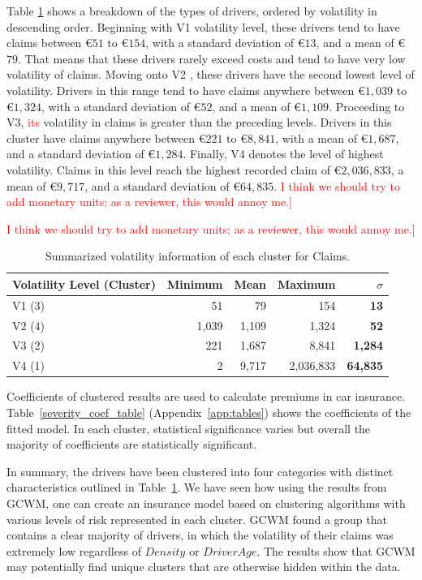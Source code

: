 \documentclass[11pt,letterpaper]{article}
\numberwithin{equation}{section}
\numberwithin{equation}{section}
\numberwithin{equation}{section}
\begin{document}
Table \ref{table:volSev} shows a breakdown of the types of drivers, ordered by volatility in descending order. Beginning with V1 volatility level, these drivers tend to have claims between \euro$51$ to  \euro$ 154$, with a standard deviation of  \euro$13$, and a mean of  \euro$79$. That means that these drivers rarely exceed costs and tend to have very low volatility of claims. Moving onto V2 , these drivers have the second lowest level of volatility. Drivers in this range tend to have claims anywhere between  \euro$1,039$ to  \euro$1,324$, with a standard deviation of  \euro$52$, and a mean of  \euro$1,109$.  Proceeding to V3, \textcolor{red}{its} volatility in claims is greater than the preceding levels. Drivers in this cluster have claims anywhere between  \euro$221$ to  \euro$8,841$, with a mean of  \euro$1,687$, and a standard deviation of  \euro$1,284$. Finally, V4 denotes the level of highest volatility. Claims in this level  reach the highest recorded claim of  \euro$2,036,833$, a mean of  \euro$9,717$, and a standard deviation of  \euro$64,835$. \textcolor{red}{I think we should try to add monetary units; as a reviewer, this would annoy me.]}

 \textcolor{red}{I think we should try to add monetary units; as a reviewer, this would annoy me.]}
 
\begin{table}[!htb]
\centering
\caption{Summarized volatility information of each cluster for Claims.}
\label{table:volSev}
\begin{tabular}{lrrrr}
\hline
Volatility Level (Cluster)     & Minimum & Mean  & Maximum & $\sigma$    \\
\hline
V1 (3) & 51  & 79 & 154 & \textbf{ 13} \\
V2 (4) & 1,039  & 1,109  &  1,324 & \textbf{ 52} \\
V3 (2) & 221 & 1,687  & 8,841  &\textbf{ 1,284}  \\
V4 (1) & 2 & 9,717 & 2,036,833  & \textbf{ 64,835}\\
\hline
\end{tabular}
\end{table}


Coefficients of clustered results are used to calculate premiums in car insurance. Table~\ref{severity_coef_table} (Appendix~\ref{app:tables}) shows the coefficients of the fitted model. In each cluster, statistical significance varies but overall the majority of coefficients are statistically significant.

In summary, the drivers have been clustered into four categories with distinct characteristics outlined in Table~\ref{table:volSev}. We have seen how using the results from GCWM, one can create an insurance model based on clustering algorithms with various levels of risk represented in each cluster. GCWM found a group that contains a clear majority of drivers, in which the volatility of their claims was extremely low regardless of $Density$ or $DriverAge$. The results show that GCWM may potentially find unique clusters that are otherwise hidden within the data.
\end{document}
